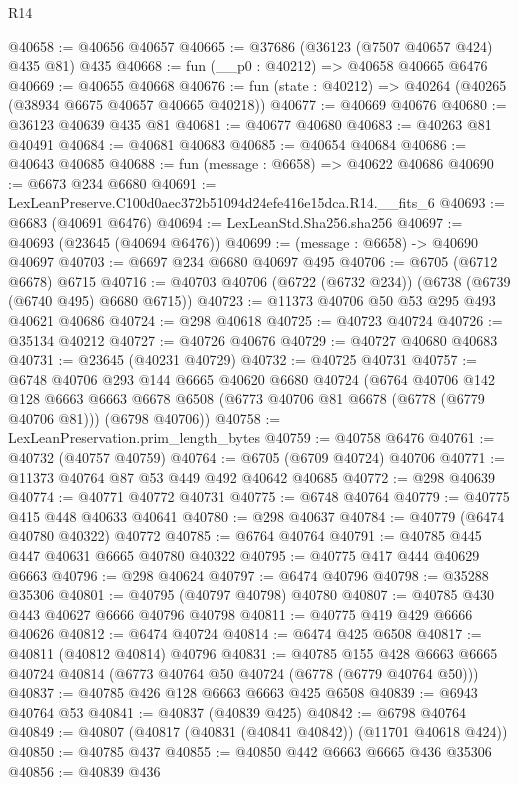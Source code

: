 \begin{lexlean}{R14}
\begin{coremodule}
@40658 := @40656 @40657
@40665 := @37686 (@36123 (@7507 @40657 @424) @435 @81) @435
@40668 := fun (__p0 : @40212) => @40658 @40665 @6476
@40669 := @40655 @40668
@40676 := fun (state : @40212) => @40264 (@40265 (@38934 @6675 @40657 @40665 @40218))
@40677 := @40669 @40676
@40680 := @36123 @40639 @435 @81
@40681 := @40677 @40680
@40683 := @40263 @81 @40491
@40684 := @40681 @40683
@40685 := @40654 @40684
@40686 := @40643 @40685
@40688 := fun (message : @6658) => @40622 @40686
@40690 := @6673 @234 @6680
@40691 := LexLeanPreserve.C100d0aec372b51094d24efe416e15dca.R14.__fits_6
@40693 := @6683 (@40691 @6476)
@40694 := LexLeanStd.Sha256.sha256
@40697 := @40693 (@23645 (@40694 @6476))
@40699 := (message : @6658) -> @40690 @40697
@40703 := @6697 @234 @6680 @40697 @495
@40706 := @6705 (@6712 @6678) @6715
@40716 := @40703 @40706 (@6722 (@6732 @234)) (@6738 (@6739 (@6740 @495) @6680 @6715))
@40723 := @11373 @40706 @50 @53 @295 @493 @40621 @40686
@40724 := @298 @40618
@40725 := @40723 @40724
@40726 := @35134 @40212
@40727 := @40726 @40676
@40729 := @40727 @40680 @40683
@40731 := @23645 (@40231 @40729)
@40732 := @40725 @40731
@40757 := @6748
    @40706
    @293
    @144
    @6665
    @40620
    @6680
    @40724
    (@6764
      @40706
      @142
      @128
      @6663
      @6663
      @6678
      @6508
      (@6773 @40706 @81 @6678 (@6778 (@6779 @40706 @81)))
      (@6798 @40706))
@40758 := LexLeanPreservation.prim_length_bytes
@40759 := @40758 @6476
@40761 := @40732 (@40757 @40759)
@40764 := @6705 (@6709 @40724) @40706
@40771 := @11373 @40764 @87 @53 @449 @492 @40642 @40685
@40772 := @298 @40639
@40774 := @40771 @40772 @40731
@40775 := @6748 @40764
@40779 := @40775 @415 @448 @40633 @40641
@40780 := @298 @40637
@40784 := @40779 (@6474 @40780 @40322) @40772
@40785 := @6764 @40764
@40791 := @40785 @445 @447 @40631 @6665 @40780 @40322
@40795 := @40775 @417 @444 @40629 @6663
@40796 := @298 @40624
@40797 := @6474 @40796
@40798 := @35288 @35306
@40801 := @40795 (@40797 @40798) @40780
@40807 := @40785 @430 @443 @40627 @6666 @40796 @40798
@40811 := @40775 @419 @429 @6666 @40626
@40812 := @6474 @40724
@40814 := @6474 @425 @6508
@40817 := @40811 (@40812 @40814) @40796
@40831 := @40785
    @155
    @428
    @6663
    @6665
    @40724
    @40814
    (@6773 @40764 @50 @40724 (@6778 (@6779 @40764 @50)))
@40837 := @40785 @426 @128 @6663 @6663 @425 @6508
@40839 := @6943 @40764 @53
@40841 := @40837 (@40839 @425)
@40842 := @6798 @40764
@40849 := @40807 (@40817 (@40831 (@40841 @40842)) (@11701 @40618 @424))
@40850 := @40785 @437
@40855 := @40850 @442 @6663 @6665 @436 @35306
@40856 := @40839 @436

\end{coremodule}
\end{lexlean}
